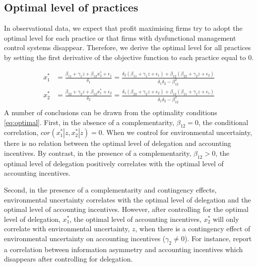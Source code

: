 \documentclass[12pt]{article}
\begin{document}
\subsection{Optimal level of practices}

In observational data, we expect that profit maximising firms try to adopt the optimal level for each practice or that firms with dysfunctional management control systems disappear. Therefore, we derive the optimal level for all practices by setting the first derivative of the objective function to each practice equal to 0.

\begin{equation}\label{eq:optimal}
\begin{aligned}
x_1^* &= \frac{\beta_{11} + \gamma_1 z + \beta_{12} x_2^*  + \epsilon_{1}}{\delta_1 }
		      = \frac{\delta_2 (\beta_{11} + \gamma_1 z + \epsilon_1) 
           					+ \beta_{12} (\beta_{22} + \gamma_2 z + \epsilon_2) }
                            {\delta_1 \delta_2 - \beta_{12}^2} \\
 x_2^* &= \frac{\beta_{22} + \gamma_2 z + \beta_{12} x_1^* + \epsilon_{2}}{\delta_2  }
		      =  \frac{\delta_1 (\beta_{22} + \gamma_2 z + \epsilon_2) 
           					+ \beta_{12} (\beta_{11} + \gamma_1 z + \epsilon_1) }
                            {\delta_1 \delta_2 - \beta_{12}^2} \\
\end{aligned}
\end{equation}
A number of conclusions can be drawn from the optimality conditions \eqref{eq:optimal}. First, in the absence of a complementarity, $\beta_{12} = 0$, the conditional correlation, $cor(x^*_1 | z, x^*_2 |z) = 0$. When we control for environmental uncertainty, there is no relation between the optimal level of delegation and accounting incentives. By contrast, in the presence of a complementarity, $\beta_{12} > 0$, the optimal level of delegation positively correlates with the optimal level of accounting incentives. 

Second, in the presence of a complementarity and contingency effects, environmental uncertainty correlates with the optimal level of delegation and the optimal level of accounting incentives.  However, after controlling for the optimal level of delegation, $x_1^*$, the optimal level of accounting incentives, $x_2^*$  will only correlate with environmental uncertainty, $z$, when there is a contingency effect of environmental uncertainty on accounting incentives ($\gamma_2 \neq 0$).  For instance, \citet{abernethy_determinants_2004} report a correlation between information asymmetry and accounting incentives which disappears after controlling for delegation.
\end{document}

